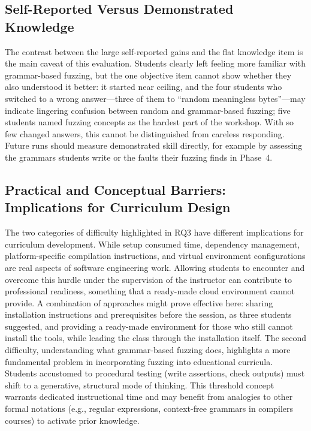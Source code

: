 \documentclass[conference]{IEEEtran}
\begin{document}
\subsection{Self-Reported Versus Demonstrated Knowledge}

The contrast between the large self-reported gains and the flat knowledge item is the main caveat of this evaluation.
Students clearly left feeling more familiar with grammar-based fuzzing, but the one objective item cannot show whether they also understood it better: it started near ceiling, and the four students who switched to a wrong answer---three of them to ``random meaningless bytes''---may indicate lingering confusion between random and grammar-based fuzzing; five students named fuzzing concepts as the hardest part of the workshop.
With so few changed answers, this cannot be distinguished from careless responding.
Future runs should measure demonstrated skill directly, for example by assessing the grammars students write or the faults their fuzzing finds in Phase~4.

\subsection{Practical and Conceptual Barriers: Implications for Curriculum Design}

The two categories of difficulty highlighted in RQ3 have different implications for curriculum development.
While setup consumed time, dependency management, platform-specific compilation instructions, and virtual environment configurations are real aspects of software engineering work.
Allowing students to encounter and overcome this hurdle under the supervision of the instructor can contribute to professional readiness, something that a ready-made cloud environment cannot provide.
A combination of approaches might prove effective here: sharing installation instructions and prerequisites before the session, as three students suggested, and providing a ready-made environment for those who still cannot install the tools, while leading the class through the installation itself.
The second difficulty, understanding what grammar-based fuzzing does, highlights a more fundamental problem in incorporating fuzzing into educational curricula.
Students accustomed to procedural testing (write assertions, check outputs) must shift to a generative, structural mode of thinking.
This threshold concept warrants dedicated instructional time and may benefit from analogies to other formal notations (e.g., regular expressions, context-free grammars in compilers courses) to activate prior knowledge.
\end{document}
